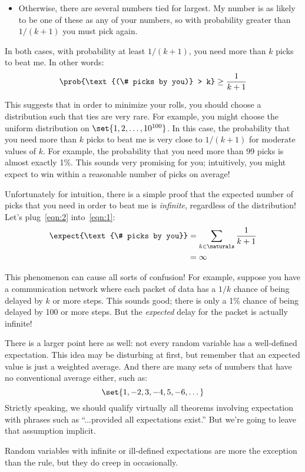 \begin{editingnotes}
\begin{itemize}
\item Otherwise, there are several numbers tied for largest.  My
number is as likely to be one of these as any of your numbers, so with
probability greater than $1/(k+1)$ you must pick again.

\end{itemize}
%
In both cases, with probability at least $1/(k+1)$, you need more than
$k$ picks to beat me.  In other words:
%
\begin{align}
\prob{\text{(\# picks by you)} > k} \geq \frac{1}{k+1} \label{eqn:2}
\end{align}

This suggests that in order to minimize your rolls, you should choose a
distribution such that ties are very rare.  For example, you might
choose the uniform distribution on $\set{1, 2, \dots, 10^{100}}$.  In
this case, the probability that you need more than $k$ picks to beat
me is very close to $1/(k+1)$ for moderate values of $k$.  For
example, the probability that you need more than 99 picks is almost
exactly 1\%.  This sounds very promising for you; intuitively, you
might expect to win within a reasonable number of picks on average!

Unfortunately for intuition, there is a simple proof that the expected
number of picks that you need in order to beat me is
\emph{infinite}, regardless of the distribution!  Let's
plug~\eqref{eqn:2} into~\eqref{eqn:1}:
%
\begin{align*}
\expect{\text{\# picks by you}}
    & = \sum_{k \in \naturals} \frac{1}{k+1} \\
    & = \infty
\end{align*}

This phenomenon can cause all sorts of confusion!  For example,
suppose you have a communication network where each packet of data has
a $1/k$ chance of being delayed by $k$ or more steps.  This sounds
good; there is only a 1\% chance of being delayed by 100 or more
steps.  But the \emph{expected} delay for the packet is actually
infinite!

There is a larger point here as well: not every random variable has a
well-defined expectation.  This idea may be disturbing at first, but
remember that an expected value is just a weighted average.  And there
are many sets of numbers that have no conventional average either, such as:
%
\[
\set{1, -2, 3, -4, 5, -6, \dots}
\]
%
Strictly speaking, we should qualify virtually all theorems involving
expectation with phrases such as ``...provided all expectations exist.''
But we're going to leave that assumption implicit.

Random variables with infinite or ill-defined expectations are more the
exception than the rule, but they do creep in occasionally.

\end{editingnotes}

